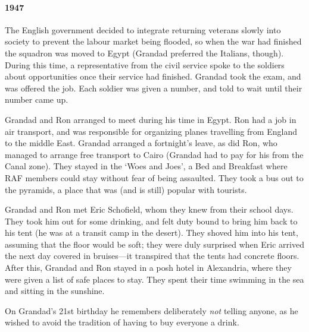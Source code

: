 \paragraph{1947} The English government
decided to integrate returning veterans slowly into society to prevent the labour market being
flooded, so when the war had finished the squadron was moved to Egypt (Grandad preferred the Italians, though).
During this time, a
representative from the civil service spoke to the soldiers about opportunities once their
service had finished. Grandad took the exam, and was offered the job. Each soldier was given
a number, and told to wait until their number came up.

Grandad and Ron arranged to meet during his time in Egypt. Ron had a job
in air transport, and was responsible for organizing planes travelling from England
to the middle East. Grandad arranged a fortnight's leave, as did Ron, who
managed to arrange free transport to Cairo (Grandad had to pay for his from
the Canal zone). They stayed in the `Woes and Joes', a Bed and Breakfast where RAF members
could stay without fear of being assaulted. They took a bus out to the pyramids, a place
that was (and is still) popular with tourists.

Grandad and Ron met Eric Schofield, whom they knew from their school days. They
took him out for some drinking, and felt duty bound to bring him back to his tent (he was
at a transit camp in the desert). They shoved him into his tent, assuming that
the floor would be soft; they were duly surprised when Eric arrived the next day
covered in bruises---it transpired that the tents had concrete floors. After this,
Grandad and Ron stayed in a posh hotel in Alexandria, where they were given
a list of safe places to stay. They spent their time swimming in the sea
and sitting in the sunshine.

\begin{figure}
	\centering
\end{figure}
On Grandad's 21st birthday he remembers deliberately \emph{not} telling anyone, as
he wished to avoid the tradition of having to buy everyone a drink.

